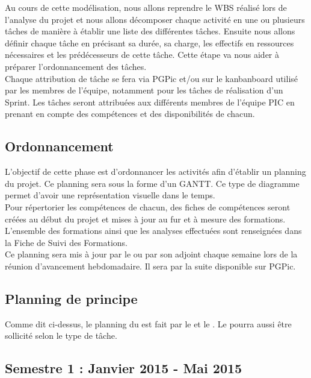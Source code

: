 Au cours de cette modélisation, nous allons reprendre le WBS réalisé lors de l’analyse du projet et nous allons décomposer chaque activité en une ou plusieurs tâches de manière à établir une liste des différentes tâches. Ensuite nous allons définir chaque tâche en précisant sa durée, sa charge, les effectifs en ressources nécessaires et les prédécesseurs de cette tâche. Cette étape va nous aider à préparer l’ordonnancement des tâches.\\

Chaque attribution de tâche se fera via PGPic et/ou sur le kanbanboard utilisé par les membres de l'équipe, notamment pour les tâches de réalisation d’un Sprint. Les tâches seront attribuées aux différents membres de l’équipe PIC en prenant en compte des compétences et des disponibilités de chacun.

\subsection{Ordonnancement}
\label{ordonnancement}

L'objectif de cette phase est d'ordonnancer les activités afin d'établir un planning du projet. Ce planning sera sous la forme d'un GANTT. Ce type de diagramme permet d’avoir une représentation visuelle dans le temps.\\

Pour répertorier les compétences de chacun, des fiches de compétences seront créées au début du projet et mises à jour au fur et à mesure des formations. L’ensemble des formations ainsi que les analyses effectuées sont renseignées dans la Fiche de Suivi des Formations.\\ 

Ce planning sera mis à jour par le \CP{}  ou par son adjoint chaque semaine lors de la réunion d’avancement hebdomadaire. Il sera par la suite disponible sur PGPic.


\subsection{Planning de principe}
\label{planning_de_principe}

Comme dit ci-dessus, le planning du \PICCourt est fait par le \CP{}  et le \CPA{}. Le \RD{}  pourra aussi être sollicité selon le type de tâche.

\subsection*{Semestre 1 : Janvier 2015 - Mai 2015}

